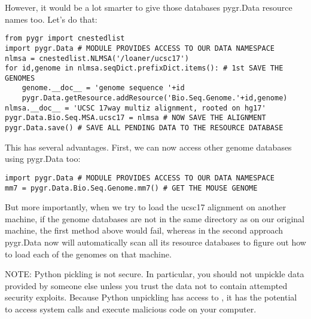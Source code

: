 \documentclass{howto}
\begin{document}
However, it would be a lot smarter to give those databases pygr.Data resource
names too.  Let's do that:
\begin{verbatim}
from pygr import cnestedlist
import pygr.Data # MODULE PROVIDES ACCESS TO OUR DATA NAMESPACE
nlmsa = cnestedlist.NLMSA('/loaner/ucsc17')
for id,genome in nlmsa.seqDict.prefixDict.items(): # 1st SAVE THE GENOMES
    genome.__doc__ = 'genome sequence '+id
    pygr.Data.getResource.addResource('Bio.Seq.Genome.'+id,genome)
nlmsa.__doc__ = 'UCSC 17way multiz alignment, rooted on hg17'
pygr.Data.Bio.Seq.MSA.ucsc17 = nlmsa # NOW SAVE THE ALIGNMENT
pygr.Data.save() # SAVE ALL PENDING DATA TO THE RESOURCE DATABASE
\end{verbatim}

This has several advantages.  First, we can now access other genome databases
using pygr.Data too:
\begin{verbatim}
import pygr.Data # MODULE PROVIDES ACCESS TO OUR DATA NAMESPACE
mm7 = pygr.Data.Bio.Seq.Genome.mm7() # GET THE MOUSE GENOME
\end{verbatim}
But more importantly, when we try to load the ucsc17 alignment on
another machine, if the genome databases are not in the same directory
as on our original machine, the first method above would fail, whereas in
the second approach pygr.Data now will automatically scan all its resource databases to
figure out how to load each of the genomes on that machine.

NOTE: Python pickling is not secure.  In particular, you should not unpickle
data provided by someone else unless you trust the data not to contain 
attempted security exploits.  Because Python unpickling has access to ,
it has the potential to access system calls and execute malicious code on your
computer.
\end{document}
